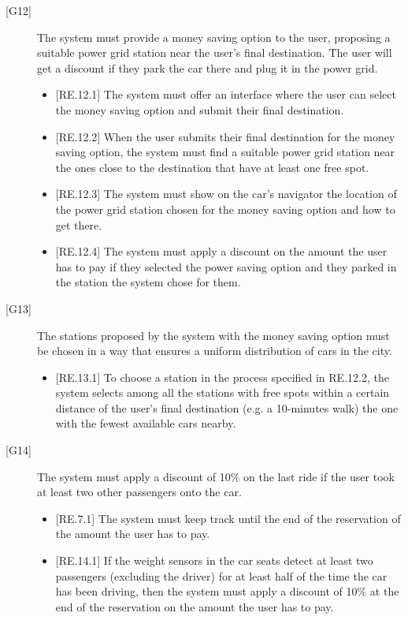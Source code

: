 \documentclass[english]{article}
\begin{document}
\begin{description}
\item[{[G12]}]{The system must provide a money saving option to the user, proposing a suitable power grid station near the user’s final destination. The user will get a discount if they park the car there and plug it in the power grid.
\begin{itemize}
	\item{[RE.12.1] The system must offer an interface where the user can select the money saving option and submit their final destination.}
	\item{[RE.12.2] When the user submits their final destination for the money saving option, the system must find a suitable power grid station near the ones close to the destination that have at least one free spot.}
	\item{[RE.12.3] The system must show on the car's navigator the location of the power grid station chosen for the money saving option and how to get there.}
	\item{[RE.12.4] The system must apply a discount on the amount the user has to pay if they selected the power saving option and they parked in the station the system chose for them.}
\end{itemize}
}

\item[{[G13]}]{The stations proposed by the system with the money saving option must be chosen in a way that ensures a uniform distribution of cars in the city.
\begin{itemize}
	\item{[RE.13.1] To choose a station in the process specified in RE.12.2, the system selects among all the stations with free spots within a certain distance of the user’s final destination (e.g. a 10-minutes walk) the one with the fewest available cars nearby.}
\end{itemize}
}

\item[{[G14]}]{The system must apply a discount of 10\% on the last ride if the user took at least two other passengers onto the car.
\begin{itemize}
	\item{[RE.7.1] The system must keep track until the end of the reservation of the amount the user has to pay.}
	\item{[RE.14.1] If the weight sensors in the car seats detect at least two passengers (excluding the driver) for at least half of the time the car has been driving, then the system must apply a discount of 10\% at the end of the reservation on the amount the user has to pay.}
\end{itemize}
}


\end{description}
\end{document}
